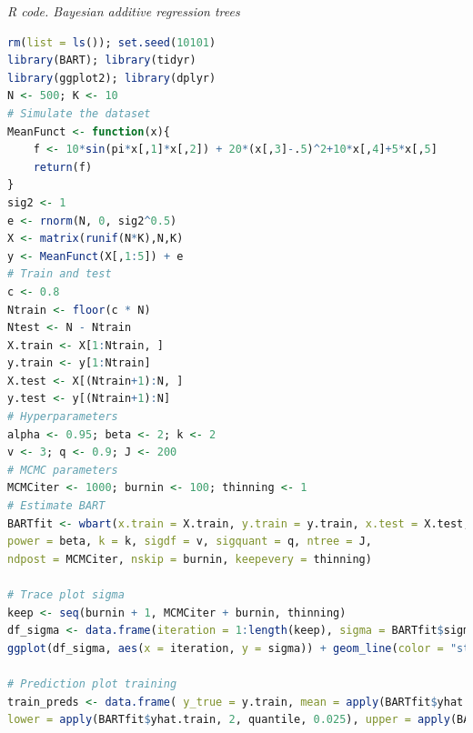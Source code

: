 \begin{tcolorbox}[enhanced,width=4.67in,center upper,
	fontupper=\large\bfseries,drop shadow southwest,sharp corners]
	\textit{R code. Bayesian additive regression trees}
	\begin{VF}
		\begin{lstlisting}[language=R]
rm(list = ls()); set.seed(10101)
library(BART); library(tidyr)
library(ggplot2); library(dplyr)
N <- 500; K <- 10
# Simulate the dataset
MeanFunct <- function(x){
	f <- 10*sin(pi*x[,1]*x[,2]) + 20*(x[,3]-.5)^2+10*x[,4]+5*x[,5]
	return(f)
}
sig2 <- 1
e <- rnorm(N, 0, sig2^0.5)
X <- matrix(runif(N*K),N,K)
y <- MeanFunct(X[,1:5]) + e
# Train and test
c <- 0.8
Ntrain <- floor(c * N)
Ntest <- N - Ntrain
X.train <- X[1:Ntrain, ]
y.train <- y[1:Ntrain]
X.test <- X[(Ntrain+1):N, ]
y.test <- y[(Ntrain+1):N]
# Hyperparameters
alpha <- 0.95; beta <- 2; k <- 2
v <- 3; q <- 0.9; J <- 200
# MCMC parameters
MCMCiter <- 1000; burnin <- 100; thinning <- 1
# Estimate BART
BARTfit <- wbart(x.train = X.train, y.train = y.train, x.test = X.test, base = alpha,
power = beta, k = k, sigdf = v, sigquant = q, ntree = J,
ndpost = MCMCiter, nskip = burnin, keepevery = thinning)

# Trace plot sigma
keep <- seq(burnin + 1, MCMCiter + burnin, thinning)
df_sigma <- data.frame(iteration = 1:length(keep), sigma = BARTfit$sigma[keep])
ggplot(df_sigma, aes(x = iteration, y = sigma)) + geom_line(color = "steelblue") + labs(title = "Trace Plot of Sigma", x = "Iteration", y = expression(sigma)) + theme_minimal()

# Prediction plot training
train_preds <- data.frame( y_true = y.train, mean = apply(BARTfit$yhat.train, 2, mean),
lower = apply(BARTfit$yhat.train, 2, quantile, 0.025), upper = apply(BARTfit$yhat.train, 2, quantile, 0.975)) %>% arrange(y_true) %>% mutate(index = row_number())
\end{lstlisting}
	\end{VF}
\end{tcolorbox}


